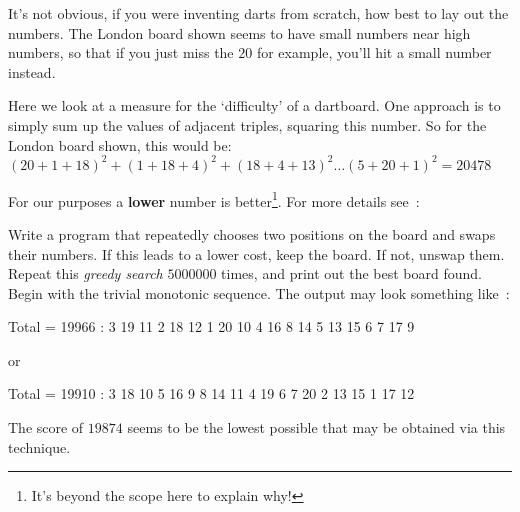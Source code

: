 


It's not obvious, if you were inventing darts from scratch, how best to
lay out the numbers. The London board shown seems to have small numbers near high numbers,
so that if you just miss the $20$ for example, you'll hit a small number instead.

Here we look at a measure for the `difficulty' of a dartboard.
One approach is to simply sum up the values of adjacent triples, squaring 
this number. So for the London board shown, this would be:
\begin{math}
(20+1+18)^2 + (1+18+4)^2 + (18+4+13)^2 \dots (5+20+1)^2 = 20478
\end{math}

For our purposes a {\bf lower} number is better\footnote{It's beyond
the scope here to explain why!}. For more details see~:

\begin{exercise}
Write a program that repeatedly chooses two
positions on the board and swaps their numbers. If this leads to a lower cost,
keep the board. If not, unswap them. Repeat this {\it greedy search}
$5000000$ times, and print out the best board found.
Begin with the trivial monotonic sequence.
The output may look something like~:
\begin{terminaloutput}
Total = 19966 :  3 19 11  2 18 12  1 20 10  4 16  8
14  5 13 15  6  7 17  9 
\end{terminaloutput}
or
\begin{terminaloutput}
Total = 19910 :  3 18 10  5 16  9  8 14 11  4 19  6
7 20  2 13 15  1 17 12 
\end{terminaloutput}

The score of $19874$ seems to be the lowest possible that may be obtained via this technique.
\end{exercise}

